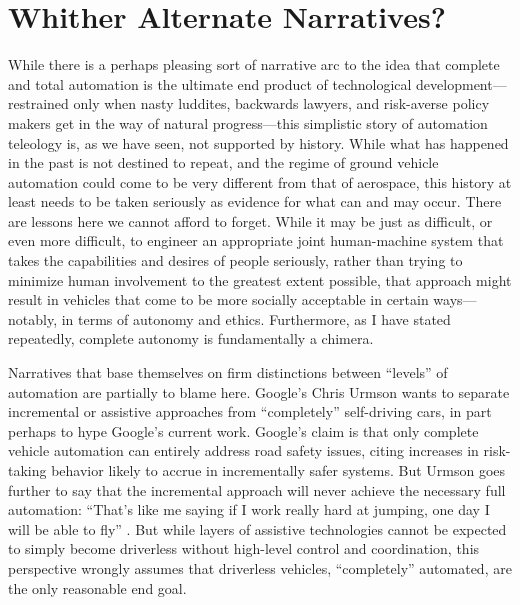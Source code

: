 \section{Whither Alternate Narratives?}

While there is a perhaps pleasing sort of narrative arc to the idea
that complete and total automation is the ultimate end product of
technological development---restrained only when nasty luddites, backwards lawyers, and
risk-averse policy makers get in the way of natural progress---this
simplistic story of automation
teleology is, as we have seen, not supported by history. While what
has happened in the 
past is not destined to repeat, and the regime of ground vehicle
automation could come to be very different from that of aerospace,
this history at least needs to be taken seriously as evidence for what
can and may occur. There are lessons here we cannot afford to forget.
While it may be just as difficult, or even more difficult, to engineer
an appropriate joint human-machine system that takes the capabilities
and desires of people seriously, rather than trying to minimize human
involvement to the greatest extent possible, that approach might
result in vehicles that 
come to be more socially acceptable in certain ways---notably, in
terms of autonomy and ethics. Furthermore, as I have stated
repeatedly, complete autonomy is fundamentally a chimera.



Narratives that base themselves on firm distinctions between
``levels'' of automation are partially to blame here. Google's Chris
Urmson wants to separate incremental or assistive 
approaches from ``completely'' self-driving cars, in part perhaps to
hype Google's current work. Google's claim is that only complete
vehicle automation can entirely address road safety issues, citing
increases in risk-taking behavior likely to accrue in incrementally safer systems.
But Urmson goes further to say that the incremental approach will
never achieve the necessary full automation: ``That's like me saying
if I work really hard at jumping, one day I will be able to fly''
\cite{friedGoogle}.
But while layers of assistive technologies cannot be expected to simply become
driverless without high-level control and coordination, this perspective wrongly
assumes that driverless vehicles, ``completely'' automated, are the
only reasonable end goal. 

